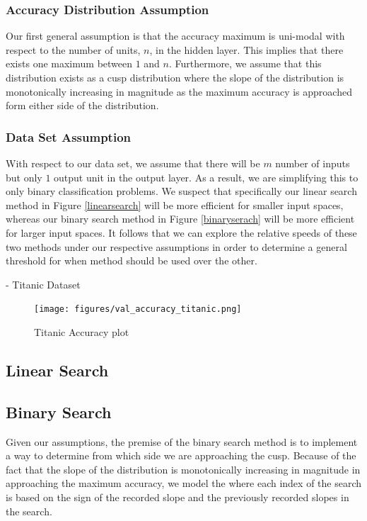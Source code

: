 \documentclass[runningheads]{llncs}
\begin{document}
\subsubsection{Accuracy Distribution Assumption}

Our first general assumption is that the accuracy maximum is uni-modal with respect to the number of units, $n$, in the hidden layer. This implies that there exists one maximum between $1$ and $n$. Furthermore, we assume that this distribution exists as a cusp  distribution where the slope of the distribution is monotonically increasing in magnitude as the maximum accuracy is approached form either side of the distribution.

\subsubsection{Data Set Assumption} \label{datasetaummption}

With respect to our data set, we assume that there will be $m$ number of inputs but only $1$ output unit in the output layer. As a result, we are simplifying this to only binary classification problems. We suspect that specifically our linear search method in Figure \autoref{linearsearch} will be more efficient for smaller input spaces, whereas our binary search method in Figure \autoref{binaryserach} will be more efficient for larger input spaces. It follows that we can explore the relative speeds of these two methods under our respective assumptions in order to determine a general threshold for when method should be used over the other.


- Titanic Dataset

\begin{figure}[H]
    \centering
    \texttt{[image: figures/val\_accuracy\_titanic.png]}
    \caption{Titanic Accuracy plot}
    \label{fig:titanic_accuracy}
\end{figure}


\subsection{Linear Search} \label{linearsearch}

\subsection{Binary Search} \label{binaryserach}

Given our assumptions, the premise of the binary search method is to implement a way to determine from which side we are approaching the cusp. Because of the fact that the slope of the distribution is monotonically increasing in magnitude in approaching the maximum accuracy, we model the where each index of the search is based on the sign of the recorded slope and the previously recorded slopes in the search. 
\end{document}
